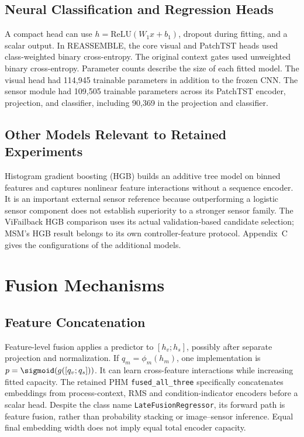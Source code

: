 \subsection{Neural Classification and Regression Heads}
A compact head can use $h=\mathrm{ReLU}(W_1x+b_1)$, dropout during fitting, and a scalar output. In REASSEMBLE, the core visual and PatchTST heads used class-weighted binary cross-entropy. The original context gates used unweighted binary cross-entropy. Parameter counts describe the size of each fitted model. The visual head had 114,945 trainable parameters in addition to the frozen CNN. The sensor module had 109,505 trainable parameters across its PatchTST encoder, projection, and classifier, including 90,369 in the projection and classifier.

\subsection{Other Models Relevant to Retained Experiments}
Histogram gradient boosting (HGB) builds an additive tree model on binned features and captures nonlinear feature interactions without a sequence encoder. It is an important external sensor reference because outperforming a logistic sensor component does not establish superiority to a stronger sensor family. The ViFailback HGB comparison uses its actual validation-based candidate selection; MSM's HGB result belongs to its own controller-feature protocol. Appendix~C gives the configurations of the additional models.

\section{Fusion Mechanisms}
\subsection{Feature Concatenation}
Feature-level fusion applies a predictor to $[h_v;h_s]$, possibly after separate projection and normalization. If $q_m=\phi_m(h_m)$, one implementation is $p=\sigmoid(g([q_v;q_s]))$. It can learn cross-feature interactions while increasing fitted capacity. The retained PHM \texttt{fused\_all\_three} specifically concatenates embeddings from process-context, RMS and condition-indicator encoders before a scalar head. Despite the class name \texttt{LateFusionRegressor}, its forward path is feature fusion, rather than probability stacking or image--sensor inference. Equal final embedding width does not imply equal total encoder capacity.

